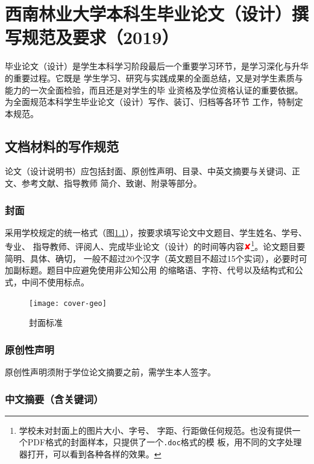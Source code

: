 \documentclass{swfuthesis}
\begin{document}
\singlespacing

\chapter{西南林业大学本科生毕业论文（设计）撰写规范及要求（2019）}
\label{cha:std}

毕业论文（设计）是学生本科学习阶段最后一个重要学习环节，是学习深化与升华的重要过程。它既是
学生学习、研究与实践成果的全面总结，又是对学生素质与能力的一次全面检验，而且还是对学生的毕
业资格及学位资格认证的重要依据。为全面规范本科学生毕业论文（设计）写作、装订、归档等各环节
工作，特制定本规范。

\section{文档材料的写作规范}

论文（设计说明书）应包括封面、原创性声明、目录、中英文摘要与关键词、正文、参考文献、指导教师
简介、致谢、附录等部分。

\subsection{封面}

采用学校规定的统一格式（图\ref{fig:cover}），按要求填写论文中文题目、学生姓名、学号、专业、
指导教师、评阅人、完成毕业论文（设计）的时间等内容{\textcolor{red}{✘}}\footnote{学校未对封面上的图片大小、字号、
  字距、行距做任何规范。也没有提供一个PDF格式的封面样本，只提供了一个\texttt{.doc}格式的模
  板，用不同的文字处理器打开，可以看到各种各样的效果。}。论文题目要简明、具体、确切，
一般不超过20个汉字（英文题目不超过15个实词），必要时可加副标题。题目中应避免使用非公知公用
的缩略语、字符、代号以及结构式和公式，中间不使用标点。

\begin{figure}
  \centering
  \texttt{[image: cover-geo]}
  \caption{封面标准\label{fig:cover}}  
\end{figure}

\subsection{原创性声明}

原创性声明须附于学位论文摘要之前，需学生本人签字。

\subsection{中文摘要（含关键词）}
\end{document}

